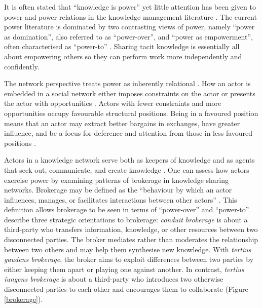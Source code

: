 It is often stated that \enquote{knowledge is power} yet little attention has been given to power and power-relations in the knowledge management literature \citep{heizmann2015power}. The current power literature is dominated by two contrasting views of power, namely \enquote{power as domination}, also referred to as \enquote{power-over}, and \enquote{power as empowerment}, often characterised as \enquote{power-to} \citep{haugaard2012rethinking}. Sharing tacit knowledge is essentially all about empowering others so they can perform work more independently and confidently. \medskip

The network perspective treats power as inherently relational \citep{ibarra1993network}. How an actor is embedded in a social network either imposes constraints on the actor or presents the actor with opportunities \citep{burt1992structural,simpson2011network}. Actors with fewer constraints and more opportunities occupy favourable structural positions. Being in a favoured position means that an actor may extract better bargains in exchanges, have greater influence, and be a focus for deference and attention from those in less favoured positions \citep{burt1992structural,hanneman2005introduction,simpson2011network}. \medskip

Actors in a knowledge network serve both as keepers of knowledge and as agents that seek out, communicate, and create knowledge \citep{phelps2012knowledge}. One can assess how actors exercise power by examining patterns of brokerage in knowledge sharing networks. Brokerage may be defined as the \enquote{behaviour by which an actor influences, manages, or facilitates interactions between other actors} \citep{obstfeld2014brokerage}. This definition allows brokerage to be seen in terms of \enquote{power-over} and \enquote{power-to}. \citet{obstfeld2014brokerage} describe three strategic orientations to brokerage: \emph{conduit brokerage} is about a third-party who transfers information, knowledge, or other resources between two disconnected parties. The broker mediates rather than moderates the relationship between two others and may help them synthesise new knowledge. With \emph{tertius gaudens brokerage}, the broker aims to exploit differences between two parties by either keeping them apart or playing one against another. In contrast, \emph{tertius iungens brokerage} is about a third-party who introduces two otherwise disconnected parties to each other and encourages them to collaborate (Figure \ref{brokerage}). \medskip 

